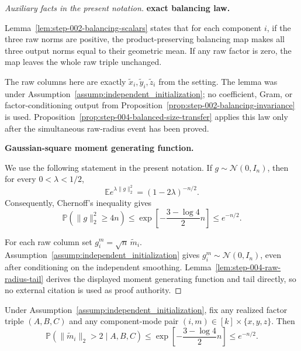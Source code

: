 \begin{proof}[Auxiliary facts in the present notation]


\medskip\noindent\textbf{exact balancing law.}\par

Lemma~\ref{lem:step-002-balancing-scalars} states that for each component
\(i\), if the three raw norms are positive, the product-preserving balancing
map makes all three output norms equal to their geometric mean. If any raw
factor is zero, the map leaves the whole raw triple unchanged.

The raw columns here are exactly
\(\widetilde x_i,\widetilde y_i,\widetilde z_i\) from the setting. The lemma
was under Assumption~\ref{assump:independent_initialization}; no
coefficient, Gram, or factor-conditioning output from Proposition~\ref{prop:step-002-balancing-invariance} is used.
Proposition~\ref{prop:step-004-balanced-size-transfer} applies this law only
after the simultaneous raw-radius event has been proved.


\medskip\noindent\textbf{Gaussian-square moment generating function.}\par

We use the following statement in the present notation. If \(g\sim\mathcal N(0,I_n)\), then for every
\(0<\lambda<1/2\),
\[
  \mathbb E e^{\lambda\|g\|_2^2}=(1-2\lambda)^{-n/2}.
\]
Consequently, Chernoff's inequality gives
\[
  \mathbb P(\|g\|_2^2\ge 4n)
  \le \exp\!\left[-\frac{3-\log 4}{2}n\right]
  \le e^{-n/2}.
\]

For each raw column set
\(g_i^m=\sqrt n\,\widetilde m_i\). Assumption~\ref{assump:independent_initialization}
gives \(g_i^m\sim\mathcal N(0,I_n)\), even after conditioning on the
independent smoothing. Lemma~\ref{lem:step-004-raw-radius-tail} derives the
displayed moment generating function and tail directly, so no external
citation is used as proof authority.

\end{proof}



\begin{lemma}
\label{lem:step-004-raw-radius-tail}
Under Assumption~\ref{assump:independent_initialization}, fix any realized
factor triple \((A,B,C)\) and any component-mode pair
\((i,m)\in[k]\times\{x,y,z\}\). Then
\[
  \mathbb P\!\left(\|\widetilde m_i\|_2>2\mid A,B,C\right)
  \le \exp\!\left[-\frac{3-\log4}{2}n\right]
  \le e^{-n/2}.
\]

\end{lemma}

